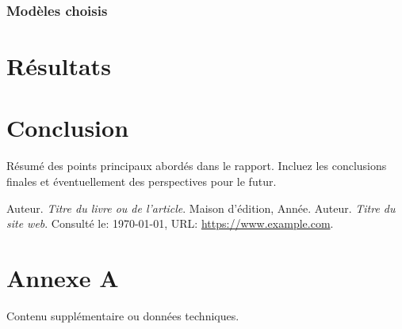 \documentclass[a4paper,12pt]{report}
\begin{document}
\subsection{Modèles choisis}

\chapter{Résultats}

\chapter{Conclusion}
Résumé des points principaux abordés dans le rapport. Incluez les conclusions finales et éventuellement des perspectives pour le futur.

\begin{thebibliography}{99}
 Auteur. \emph{Titre du livre ou de l'article}. Maison d'édition, Année.
 Auteur. \emph{Titre du site web}. Consulté le: \today, URL: \url{https://www.example.com}.
\end{thebibliography}

\appendix
\chapter{Annexe A}
Contenu supplémentaire ou données techniques.
\end{document}
